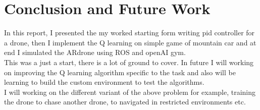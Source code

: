 \chapter{Conclusion and Future Work}

In this report, I presented the my worked starting form writing pid controller for a drone, then I implement the Q learning on simple game of mountain car and at end I simulated the ARdrone using ROS and openAI gym.
\\
This was a just a start, there is a lot of ground to cover. In future I will working on improving the Q learning algorithm specific to the task and also will be learning to build the custom environment to test the algorithms.
\\
I will working on the different variant of the above problem for example, training the drone to chase another drone, to navigated in restricted environments etc.